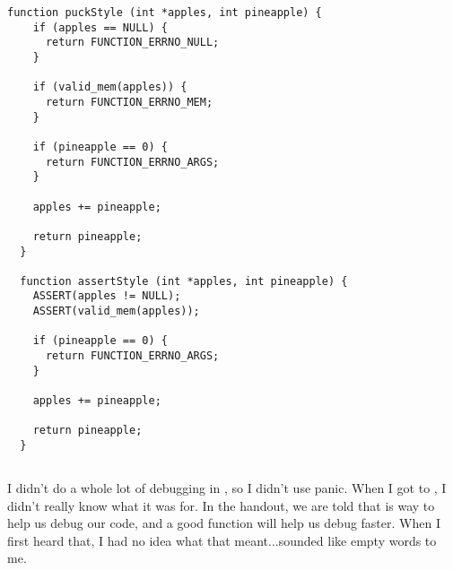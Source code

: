 \documentclass{article}
\begin{document}
\begin{lstlisting}[label={lst:error_style}, caption={Comparing passing the puck and assertion styles}]
  function puckStyle (int *apples, int pineapple) {
    if (apples == NULL) {
      return FUNCTION_ERRNO_NULL;
    }

    if (valid_mem(apples)) {
      return FUNCTION_ERRNO_MEM;
    }

    if (pineapple == 0) {
      return FUNCTION_ERRNO_ARGS;
    }

    apples += pineapple;

    return pineapple;
  }

  function assertStyle (int *apples, int pineapple) {
    ASSERT(apples != NULL);
    ASSERT(valid_mem(apples));

    if (pineapple == 0) {
      return FUNCTION_ERRNO_ARGS;
    }

    apples += pineapple;

    return pineapple;
  }
\end{lstlisting}

\subsection{}
I didn't do a whole lot of debugging in , so I didn't use panic.
When I got to , I didn't really know what it was for.
In the handout, we are told that  is way to help us debug our code,
and a good  function will help us debug faster. When I first heard that,
I had no idea what that meant...sounded like empty words to me.
\end{document}
